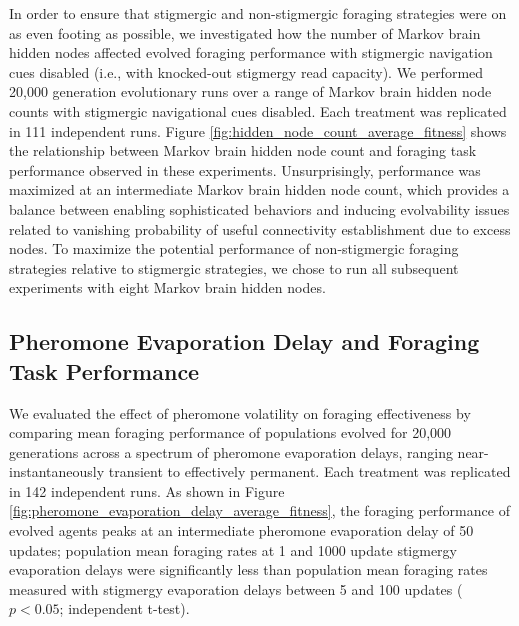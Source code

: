 In order to ensure that stigmergic and non-stigmergic foraging strategies were on as even footing as possible, we investigated how the number of Markov brain hidden nodes affected evolved foraging performance with stigmergic navigation cues disabled (i.e., with knocked-out stigmergy read capacity).
We performed 20,000 generation evolutionary runs over a range of Markov brain hidden node counts with stigmergic navigational cues disabled.
Each treatment was replicated in 111 independent runs.
Figure \ref{fig:hidden_node_count_average_fitness} shows the relationship between Markov brain hidden node count and foraging task performance observed in these experiments.
Unsurprisingly, performance was maximized at an intermediate Markov brain hidden node count, which provides a balance between enabling sophisticated behaviors and inducing evolvability issues related to vanishing probability of useful connectivity establishment due to excess nodes.
To maximize the potential performance of non-stigmergic foraging strategies relative to stigmergic strategies, we chose to run all subsequent experiments with eight Markov brain hidden nodes.

\subsection{Pheromone Evaporation Delay and Foraging Task Performance}




We evaluated the effect of pheromone volatility on foraging effectiveness by comparing mean foraging performance of populations evolved for 20,000 generations across a spectrum of pheromone evaporation delays, ranging near-instantaneously transient to effectively permanent.
Each treatment was replicated in 142 independent runs.
As shown in Figure \ref{fig:pheromone_evaporation_delay_average_fitness}, the foraging performance of evolved agents peaks at an intermediate pheromone evaporation delay of 50 updates;
population mean foraging rates at 1 and 1000 update stigmergy evaporation delays were significantly less than population mean foraging rates measured with stigmergy evaporation delays between 5 and 100 updates ($p < 0.05$; independent t-test).

